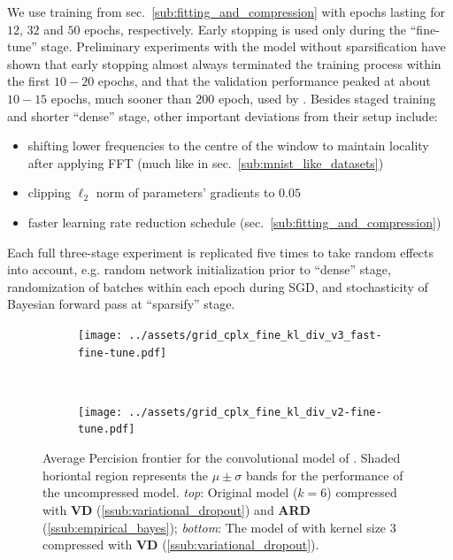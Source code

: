 \documentclass[a4paper,10pt]{article}
\begin{document}
We use training from sec.~\ref{sub:fitting_and_compression} with epochs lasting for $12$,
$32$ and $50$ epochs, respectively. Early stopping is used only during the ``fine-tune''
stage. Preliminary experiments with the model without sparsification have shown that early
stopping almost always terminated the training process within the first $10-20$ epochs,
and that the validation performance peaked at about $10-15$ epochs, much sooner than $200$
epoch, used by \citet{trabelsi_deep_2017}. Besides staged training and shorter ``dense''
stage, other important deviations from their setup include:
\begin{itemize}
  \item shifting lower frequencies to the centre of the window to maintain locality after
  applying FFT (much like in sec.~\ref{sub:mnist_like_datasets})
  \item clipping $\ell_2$ norm of parameters' gradients to $0.05$
  \item faster learning rate reduction schedule (sec.~\ref{sub:fitting_and_compression})
\end{itemize}
Each full three-stage experiment is replicated five times to take random effects into account,
e.g. random network initialization prior to ``dense'' stage, randomization of batches within
each epoch during SGD, and stochasticity of Bayesian forward pass at ``sparsify'' stage.


\begin{figure}[!ht]
  \centering
  \begin{subfigure}[b]{0.9\textwidth}  %
    \centering
    \texttt{[image: ../assets/grid\_cplx\_fine\_kl\_div\_v3\_fast-fine-tune.pdf]}
  \end{subfigure} \\
  \begin{subfigure}[b]{0.9\textwidth}  %
    \centering
    \texttt{[image: ../assets/grid\_cplx\_fine\_kl\_div\_v2-fine-tune.pdf]}
  \end{subfigure}
  \caption{%
    Average Percision frontier for the convolutional model of \citet{trabelsi_deep_2017}.
    Shaded horiontal region represents the $\mu\pm\sigma$ bands for the performance of the
    uncompressed model.
    \textit{top}: Original model ($k=6$) compressed with \textbf{\color{orange} VD}
    (\ref{ssub:variational_dropout}) and \textbf{\color{blue} ARD} (\ref{ssub:empirical_bayes});
    \textit{bottom}: The model of \citet{trabelsi_deep_2017} with kernel size $3$
    compressed with \textbf{\color{blue} VD} (\ref{ssub:variational_dropout}).
  }
  \label{fig:musicnet_trade-off}
\end{figure}
\end{document}
